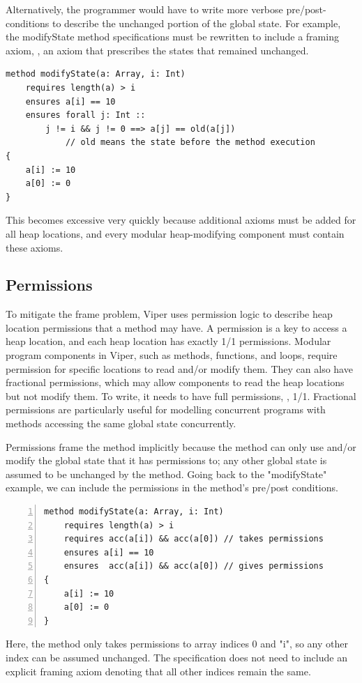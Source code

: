 \documentclass[msc,oneside]{ubcthesis}
\theoremstyle{definition}
\begin{document}
Alternatively, the programmer would have to write more verbose pre/post-conditions to describe the unchanged portion of the global state. For example, the modifyState method specifications must be rewritten to include a framing axiom, \ie, an axiom that prescribes the states that remained unchanged.
\begin{lstlisting}
method modifyState(a: Array, i: Int)
    requires length(a) > i
    ensures a[i] == 10
    ensures forall j: Int ::   
        j != i && j != 0 ==> a[j] == old(a[j])  
            // old means the state before the method execution 
{
    a[i] := 10
    a[0] := 0
}
\end{lstlisting}
This becomes excessive very quickly because additional axioms must be added for all heap locations, and every modular heap-modifying component must contain these axioms. 


\subsection{Permissions}
To mitigate the frame problem, Viper uses permission logic to describe heap location permissions that a method may have. A permission is a key to access a heap location, and each heap location has exactly 1/1 permissions. Modular program components in Viper, such as methods, functions, and loops, require permission for specific locations to read and/or modify them. They can also have fractional permissions, which may allow components to read the heap locations but not modify them. To write, it needs to have full permissions, \ie, 1/1. Fractional permissions are particularly useful for modelling concurrent programs with methods accessing the same global state concurrently.

Permissions frame the method implicitly because the method can only use and/or modify the global state that it has permissions to; any other global state is assumed to be unchanged by the method. Going back to the "modifyState" example, we can include the permissions in the method's pre/post conditions.  
\begin{lstlisting}[language=silver,numbers=left, firstnumber=1, stepnumber=1]
method modifyState(a: Array, i: Int)
    requires length(a) > i
    requires acc(a[i]) && acc(a[0]) // takes permissions
    ensures a[i] == 10
    ensures  acc(a[i]) && acc(a[0]) // gives permissions
{
    a[i] := 10
    a[0] := 0
}
\end{lstlisting}
Here, the method only takes permissions to array indices 0 and "i", so any other index can be assumed unchanged. The specification does not need to include an explicit framing axiom denoting that all other indices remain the same.
\end{document}
